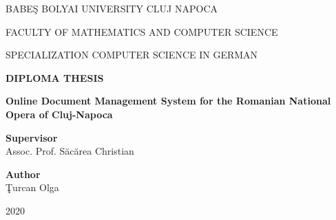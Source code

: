 \documentclass[a4paper,12pt]{report}
\begin{document}
\begin{titlepage}
  \sloppy
  \begin{center}
    BABE\c S BOLYAI UNIVERSITY CLUJ NAPOCA

    FACULTY OF MATHEMATICS AND COMPUTER SCIENCE

    SPECIALIZATION COMPUTER SCIENCE IN GERMAN

    \vspace{6cm}

    \Huge \textbf{DIPLOMA THESIS}

    \vspace{0.5cm}

    \Huge \textbf{Online Document Management System for the Romanian National Opera of Cluj-Napoca}

  \end{center}


  \vspace{3cm}

  \begin{flushleft}
    \Large{\textbf{Supervisor}}\\
    Assoc. Prof. S\u{a}c\u{a}rea Christian
  \end{flushleft}

  \begin{flushright}
    \Large{\textbf{Author}}\\
    \c Turcan Olga
  \end{flushright}

  \vspace{3cm}

  \begin{center}
    2020
  \end{center}

\end{titlepage}
\end{document}
